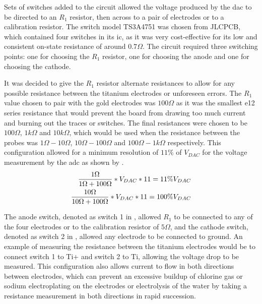 Sets of switches added to the circuit allowed the voltage produced by the \gls{dac} to be directed to an $R_1$ resistor, then across to a pair of electrodes or to a calibration resistor.
The switch model TS3A4751 was chosen from JLCPCB, which contained four switches in its \gls{ic}, as it was very cost-effective for its low and consistent on-state resistance of around $0.7\Omega$.
The circuit required three switching points: one for choosing the $R_1$ resistor, one for choosing the anode and one for choosing the cathode.

It was decided to give the $R_1$ resistor alternate resistances to allow for any possible resistance between the titanium electrodes or unforeseen errors.
The $R_1$ value chosen to pair with the gold electrodes was $100\Omega$ as it was the smallest e12 series resistance that would prevent the board from drawing too much current and burning out the traces or switches.
The final resistances were chosen to be $100\Omega$,  $1k\Omega$ and $10k\Omega$, which would be used when the resistance between the probes was $1\Omega - 10\Omega$, $10\Omega - 100\Omega$ and $100\Omega - 1k\Omega$ respectively.
This configuration allowed for a minimum resolution of $11\%$ of $V_{DAC}$ for the voltage measurement by the \gls{adc} as shown by .
\begin{align}\label{eqn:adc-resolution}
 \frac{\displaystyle1\Omega}{\displaystyle1\Omega + 100\Omega} * V_{DAC} * 11 = 11\%V_{DAC} \\
 \frac{\displaystyle10\Omega}{\displaystyle10\Omega + 100\Omega} * V_{DAC} * 11 = 100\%V_{DAC}
\end{align} 

The anode switch, denoted as switch 1 in , allowed $R_1$ to be connected to any of the four electrodes or to the calibration resistor of $5\Omega$, and the cathode switch, denoted as switch 2 in , allowed any electrode to be connected to ground.
An example of measuring the resistance between the titanium electrodes would be to connect switch 1 to Ti+ and switch 2 to Ti, allowing the voltage drop to be measured.
This configuration also allows current to flow in both directions between electrodes, which can prevent an excessive buildup of chlorine gas or sodium electroplating on the electrodes or electrolysis of the water by taking a resistance measurement in both directions in rapid succession.

